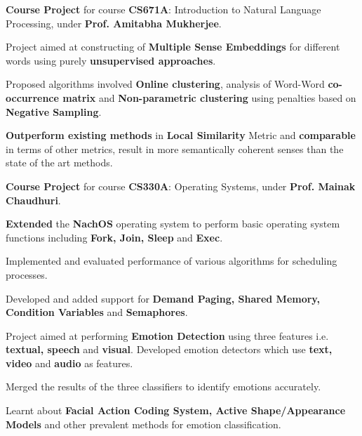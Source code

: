 \documentclass[a4paper]{norm-resume}
\begin{document}
\vspace{2mm} %

						
	\begin{tightitemize}
	\small
	{
	\item \textbf{Course Project} for course \textbf{CS671A}: Introduction to Natural Language Processing, under \textbf{Prof. Amitabha Mukherjee}.
	\item Project aimed at constructing of \textbf{Multiple Sense Embeddings} for different words using purely \textbf{unsupervised approaches}.
	\item Proposed algorithms involved \textbf{Online clustering}, analysis of Word-Word \textbf{co-occurrence matrix} and \textbf{Non-parametric clustering} using penalties based on \textbf{Negative Sampling}.
	\item \textbf{Outperform existing methods} in \textbf{Local Similarity} Metric and \textbf{comparable} in terms of other metrics, result in more semantically coherent senses than the state of the art methods.
	}
	\end{tightitemize}
		
	\vspace{2mm}

	   \descript{July '15 - Nov '15}
	\begin{tightitemize}
	\small
	{
	\item \textbf{Course Project} for course \textbf{CS330A}: Operating Systems, under \textbf{Prof. Mainak Chaudhuri}.
	\item \textbf{Extended} the \textbf{NachOS} operating system to perform basic operating system functions including \textbf{Fork, Join, Sleep} and \textbf{Exec}. 
	\item Implemented and evaluated performance of various algorithms for scheduling processes.
	\item Developed and added support for \textbf{Demand Paging, Shared Memory, Condition Variables} and \textbf{Semaphores}.	
	}
	\end{tightitemize}
		
	\vspace{2mm}
	
	   \descript{May '14 - Jun '14}
	\begin{tightitemize}
	\small
	{
	\item Project aimed at performing \textbf{Emotion Detection} using three features i.e. \textbf{textual, speech} and \textbf{visual}. Developed emotion detectors which use \textbf{text, video} and \textbf{audio} as features.
	\item Merged the results of the three classifiers to identify emotions accurately.
	\item Learnt about \textbf{Facial Action Coding System, Active Shape/Appearance Models} and other prevalent methods for emotion classification.
	}
	\end{tightitemize}
		
\end{document}
